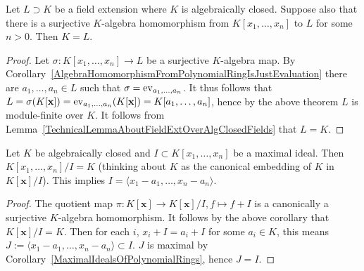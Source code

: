 \begin{corollary}\label{IfExistsSurjectiveAlgHomThenFieldExtOverAlgClosedFieldIsTrivial}
    Let $L\supset K$ be a field extension where $K$ is algebraically closed. Suppose also that there is a surjective $K$-algebra homomorphism from $K[x_1,\dots,x_n]$ to $L$ for some $n>0$. Then $K=L$. 
\end{corollary}
\begin{proof}
    Let $\sigma: K[x_1,\dots,x_n] \rightarrow L$ be a surjective $K$-algebra map. By Corollary~\ref{AlgebraHomomorphismFromPolynomialRingIsJustEvaluation} there are $a_1,\dots,a_n\in L$ such that $\sigma = \mathrm{ev}_{a_1,\dots,a_n}$. It thus follows that $L = \sigma(K[\mathbf{x}])=\mathrm{ev}_{a_1,\dots,a_n}(K[\mathbf{x}])=K[a_1,\dots,a_n]$, hence by the above theorem $L$ is module-finite over $K$. It follows from Lemma~\ref{TechnicalLemmaAboutFieldExtOverAlgClosedFields} that $L=K$. 
\end{proof}
\begin{corollary}\label{ClassificationOfMaximalPolynomialIdeals}
    Let $K$ be algebraically closed and $I\subset K[x_1,\dots,x_n]$ be a maximal ideal. Then $K[x_1,\dots,x_n]/I=K$ (thinking about $K$ as the canonical embedding of $K$ in $K[\mathbf{x}]/I$). This implies $I=\langle x_1-a_1,\dots,x_n-a_n\rangle$. 
\end{corollary}
\begin{proof}
    The quotient map $\pi : K[\mathbf{x}]\rightarrow K[\mathbf{x}]/I, f\mapsto f+I$ is a canonically a surjective $K$-algebra homomorphism. It follows by the above corollary that $K[\mathbf{x}]/I=K$. Then for each $i$, $x_i+I = a_i+ I$ for some $a_i\in K$, this means $J:=\langle x_1-a_1,\dots,x_n-a_n\rangle\subset I$. $J$ is maximal by Corollary~\ref{MaximalIdealsOfPolynomialRings}, hence $J=I$. 
\end{proof}
